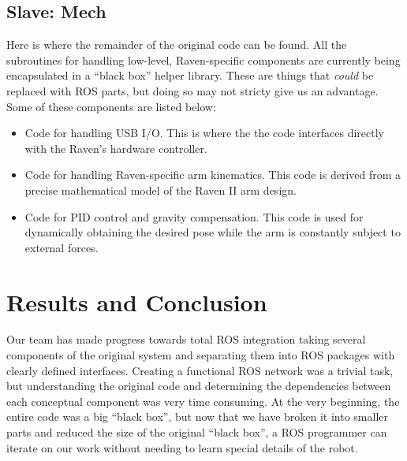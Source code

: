 \documentclass[letterpaper,twocolumn,10pt]{article}
\begin{document}
\subsection{Slave: Mech}

Here is where the remainder of the original code can be found. All the
subroutines for handling low-level, Raven-specific components are
currently being encapsulated in a ``black box'' helper library. These
are things that \emph{could} be replaced with ROS parts, but doing so
may not stricty give us an advantage. Some of these components are
listed below:

\begin{itemize}
  \item Code for handling USB I/O. This is where the the code
    interfaces directly with the Raven's hardware controller.

  \item Code for handling Raven-specific arm kinematics. This code is
    derived from a precise mathematical model of the Raven II arm
    design.

  \item Code for PID control and gravity compensation. This code is
    used for dynamically obtaining the desired pose while the arm is
    constantly subject to external forces.
\end{itemize}
 
\section{Results and Conclusion}

Our team has made progress towards total ROS integration taking
several components of the original system and separating them into ROS
packages with clearly defined interfaces. Creating a functional ROS
network was a trivial task, but understanding the original code and
determining the dependencies between each conceptual component was
very time consuming. At the very beginning, the entire code was a big
``black box'', but now that we have broken it into smaller parts and
reduced the size of the original ``black box'', a ROS programmer can
iterate on our work without needing to learn special details of the
robot.


\end{document}

